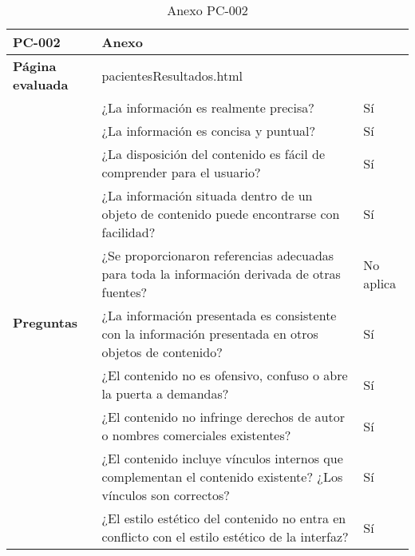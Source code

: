 \begin{table}[htpb]
\centering
\begin{tabularx}{\textwidth}{|l|X|l|}
\hline
\textbf{PC-002}                       & \multicolumn{2}{l|}{Anexo}                                                                                                \\ \hline
\textbf{Página evaluada}             & \multicolumn{2}{l|}{pacientesResultados.html}                                                                             \\ \hline
\multirow{10}{*}{\textbf{Preguntas}} & ¿La información es realmente precisa?                                                                         & Sí        \\ \cline{2-3} 
                                     & ¿La información es concisa y puntual?                                                                         & Sí        \\ \cline{2-3} 
                                     & ¿La disposición del contenido es fácil de comprender para el usuario?                                         & Sí        \\ \cline{2-3} 
                                     & ¿La información situada dentro de un objeto de contenido puede encontrarse con facilidad?                     & Sí        \\ \cline{2-3} 
                                     & ¿Se proporcionaron referencias adecuadas para toda la información derivada de otras fuentes?                  & No aplica \\ \cline{2-3} 
                                     & ¿La información presentada es consistente con la información presentada en otros objetos de contenido?        & Sí        \\ \cline{2-3} 
                                     & ¿El contenido no es ofensivo, confuso o abre la puerta a demandas?                                            & Sí        \\ \cline{2-3} 
                                     & ¿El contenido no infringe derechos de autor o nombres comerciales existentes?                                 & Sí        \\ \cline{2-3} 
                                     & ¿El contenido incluye vínculos internos que complementan el contenido existente? ¿Los vínculos son correctos? & Sí        \\ \cline{2-3} 
                                     & ¿El estilo estético del contenido no entra en conflicto con el estilo estético de la interfaz?                & Sí        \\ \hline
\end{tabularx}
\caption{Anexo PC-002}
\end{table}


